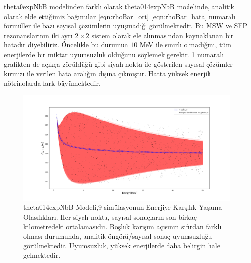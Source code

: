 theta0expNbB modelinden farklı olarak theta014expNbB modelinde, analitik olarak elde ettiğimiz bağıntılar \eqref{eqn:rhoBar_ort} \eqref{eqn:rhoBar_hata} numaralı formüller ile bazı sayısal çözümlerin uyuşmadığı görülmektedir. Bu MSW ve SFP rezonanslarının iki ayrı $ 2\times2 $ sistem olarak ele alınmasından kaynaklanan bir hatadır diyebiliriz. Öncelikle bu durumun $ 10 $ MeV ile sınırlı olmadığını, tüm enerjilerde bir miktar uyumsuzluk olduğunu söylemek gerekir. \ref{fig:theta014expNbB_energySpec_theta0_averaged} numaralı grafikten de açıkça görüldüğü gibi siyah nokta ile gösterilen sayısal çözümler kırmızı ile verilen hata aralığın dışına çıkmıştır. Hatta yüksek enerjili nötrinolarda fark büyümektedir.

\begin{figure}[hbt!]
    \centering
    \includegraphics[width=\textwidth]{figures/theta014expNbB_energySpec_theta0_averaged.pdf}
    \caption[theta014expNbB Modeli, 9 simülasyonun Enerjiye Karşılık Yaşama Olasılıkları]{theta014expNbB Modeli,9 simülasyonun Enerjiye Karşılık Yaşama Olasılıkları. Her siyah nokta, sayısal sonuçların son birkaç kilometredeki ortalamasıdır. Boşluk karışım açısının sıfırdan farklı olması durumunda, analitik öngörü/sayısal sonuç uyumsuzluğu görülmektedir. Uyumsuzluk, yüksek enerjilerde daha belirgin hale gelmektedir.}
    \label{fig:theta014expNbB_energySpec_theta0_averaged}
\end{figure}

